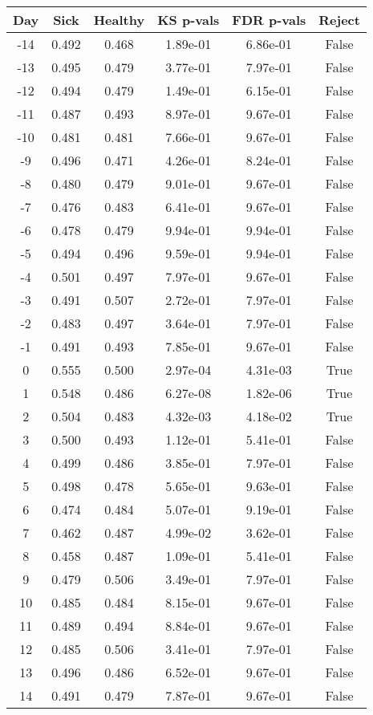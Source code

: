 \begin{tabular}{c|c|c|c|c|c}
Day &  Sick & Healthy &  KS p-vals & FDR p-vals & Reject\\
\hline
-14 & 0.492 &   0.468 &   1.89e-01 &   6.86e-01 &  False\\
-13 & 0.495 &   0.479 &   3.77e-01 &   7.97e-01 &  False\\
-12 & 0.494 &   0.479 &   1.49e-01 &   6.15e-01 &  False\\
-11 & 0.487 &   0.493 &   8.97e-01 &   9.67e-01 &  False\\
-10 & 0.481 &   0.481 &   7.66e-01 &   9.67e-01 &  False\\
 -9 & 0.496 &   0.471 &   4.26e-01 &   8.24e-01 &  False\\
 -8 & 0.480 &   0.479 &   9.01e-01 &   9.67e-01 &  False\\
 -7 & 0.476 &   0.483 &   6.41e-01 &   9.67e-01 &  False\\
 -6 & 0.478 &   0.479 &   9.94e-01 &   9.94e-01 &  False\\
 -5 & 0.494 &   0.496 &   9.59e-01 &   9.94e-01 &  False\\
 -4 & 0.501 &   0.497 &   7.97e-01 &   9.67e-01 &  False\\
 -3 & 0.491 &   0.507 &   2.72e-01 &   7.97e-01 &  False\\
 -2 & 0.483 &   0.497 &   3.64e-01 &   7.97e-01 &  False\\
 -1 & 0.491 &   0.493 &   7.85e-01 &   9.67e-01 &  False\\
  0 & 0.555 &   0.500 &   2.97e-04 &   4.31e-03 &   True\\
  1 & 0.548 &   0.486 &   6.27e-08 &   1.82e-06 &   True\\
  2 & 0.504 &   0.483 &   4.32e-03 &   4.18e-02 &   True\\
  3 & 0.500 &   0.493 &   1.12e-01 &   5.41e-01 &  False\\
  4 & 0.499 &   0.486 &   3.85e-01 &   7.97e-01 &  False\\
  5 & 0.498 &   0.478 &   5.65e-01 &   9.63e-01 &  False\\
  6 & 0.474 &   0.484 &   5.07e-01 &   9.19e-01 &  False\\
  7 & 0.462 &   0.487 &   4.99e-02 &   3.62e-01 &  False\\
  8 & 0.458 &   0.487 &   1.09e-01 &   5.41e-01 &  False\\
  9 & 0.479 &   0.506 &   3.49e-01 &   7.97e-01 &  False\\
 10 & 0.485 &   0.484 &   8.15e-01 &   9.67e-01 &  False\\
 11 & 0.489 &   0.494 &   8.84e-01 &   9.67e-01 &  False\\
 12 & 0.485 &   0.506 &   3.41e-01 &   7.97e-01 &  False\\
 13 & 0.496 &   0.486 &   6.52e-01 &   9.67e-01 &  False\\
 14 & 0.491 &   0.479 &   7.87e-01 &   9.67e-01 &  False\\
\end{tabular}